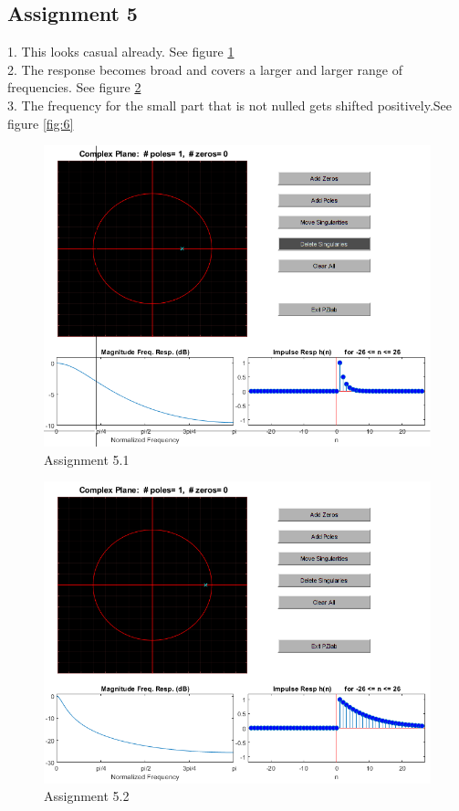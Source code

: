 \documentclass[a4paper]{article}
\begin{document}
\subsection{Assignment 5}
1. This looks casual already. See figure \ref{fig:4} \\
2. The response becomes broad and covers a larger and larger range of frequencies. See figure \ref{fig:5}\\
3. The frequency for the small part that is not nulled gets shifted positively.See figure \ref{fig:6}
\begin{figure}
    \centering
    \includegraphics{4.png}
    \caption{Assignment 5.1}
    \label{fig:4}
\end{figure}
\begin{figure}
    \centering
    \includegraphics{5.png}
    \caption{Assignment 5.2}
    \label{fig:5}
\end{figure}
\end{document}

